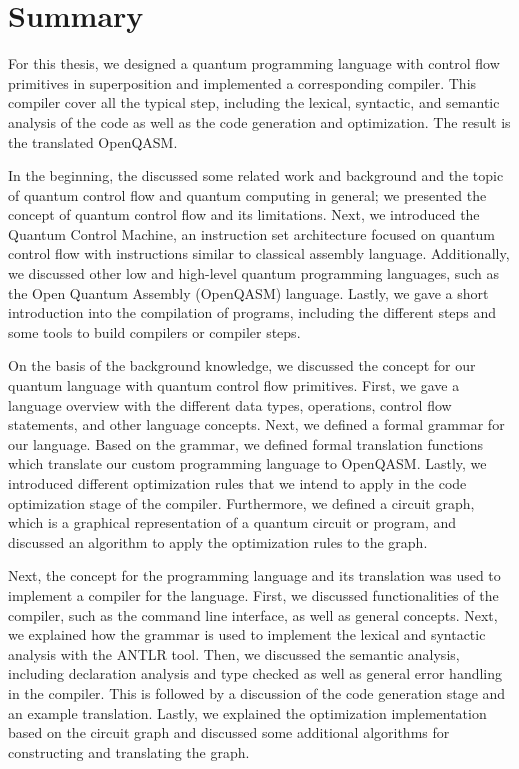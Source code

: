 \section{Summary}
For this thesis, we designed a quantum programming language with control flow primitives in superposition and implemented a corresponding compiler. This compiler cover all the typical step, including the lexical, syntactic, and semantic analysis of the code as well as the code generation and optimization. The result is the translated OpenQASM.

In the beginning, the discussed some related work and background and the topic of quantum control flow and quantum computing in general; we presented the concept of quantum control flow and its limitations. Next, we introduced the Quantum Control Machine, an instruction set architecture focused on quantum control flow with instructions similar to classical assembly language. Additionally, we discussed other low and high-level quantum programming languages, such as the Open Quantum Assembly (OpenQASM) language. Lastly, we gave a short introduction into the compilation of programs, including the different steps and some tools to build compilers or compiler steps.

On the basis of the background knowledge, we discussed the concept for our quantum language with quantum control flow primitives. First, we gave a language overview with the different data types, operations, control flow statements, and other language concepts. Next, we defined a formal grammar for our language. Based on the grammar, we defined formal translation functions which translate our custom programming language to OpenQASM. Lastly, we introduced different optimization rules that we intend to apply in the code optimization stage of the compiler. Furthermore, we defined a circuit graph, which is a graphical representation of a quantum circuit or program, and discussed an algorithm to apply the optimization rules to the graph.

Next, the concept for the programming language and its translation was used to implement a compiler for the language. First, we discussed functionalities of the compiler, such as the command line interface, as well as general concepts. Next, we explained how the grammar is used to implement the lexical and syntactic analysis with the ANTLR tool. Then, we discussed the semantic analysis, including declaration analysis and type checked as well as general error handling in the compiler. This is followed by a discussion of the code generation stage and an example translation. Lastly, we explained the optimization implementation based on the circuit graph and discussed some additional algorithms for constructing and translating the graph. 

